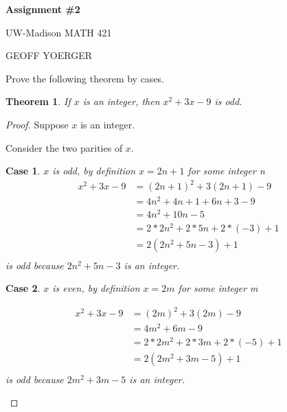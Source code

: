 \documentclass{article} %
\theoremstyle{plain}
\newtheorem*{theorem*}{Theorem}
\newtheorem{case}{Case}
\begin{document}
\begin{center}
    \Large{
        \textbf{Assignment \#2}

        UW-Madison MATH 421
    }
    
    \vspace{5pt}
        
    \normalsize{
        GEOFF YOERGER

        \usdate
    }
    
    \vspace{15pt}
\end{center}



\noindent{} Prove the following theorem by cases. 



\begin{theorem*} If $x$ is an integer, then $x^2 + 3x-9$ is odd. 

\end{theorem*}


\begin{proof}
    Suppose $x$ is an integer.

    Consider the two parities of $x$.
    
    \begin{case} $x$ is odd, by definition $x = 2n + 1$ for some integer n
        \begin{align*}
            x^2 + 3x - 9 & = (2n+1)^2 + 3(2n+1) - 9 \\
            & = 4n^2 + 4n + 1 + 6n + 3 - 9 \\
            & = 4n^2 + 10n - 5 \\
            & = 2*2n^2 + 2*5n + 2*(-3) + 1 \\
            & = 2(2n^2 + 5n - 3) + 1 \\
        \end{align*}
    is odd because $2n^2 + 5n -3$ is an integer.

    \end{case}

    \begin{case} $x$ is even, by definition $x = 2m$ for some integer m

        \begin{align*}
            x^2 + 3x - 9 & = (2m)^2 + 3(2m) - 9 \\
            & = 4m^2 + 6m - 9 \\
            & = 2*2m^2 + 2*3m + 2*(-5) + 1 \\
            & = 2(2m^2 + 3m - 5) + 1 \\
        \end{align*}
    is odd because $2m^2 + 3m - 5$ is an integer.

    \end{case}


\end{proof} 
\end{document}

